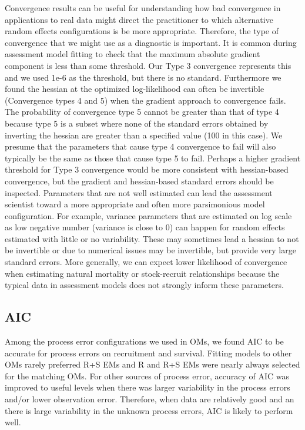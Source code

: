\documentclass[
  12pt,
]{article}
\begin{document}
Convergence results can be useful for understanding how bad convergence
in applications to real data might direct the practitioner to which
alternative random effects configurations is be more appropriate.
Therefore, the type of convergence that we might use as a diagnostic is
important. It is common during assessment model fitting to check that
the maximum absolute gradient component is less than some threshold. Our
Type 3 convergence represents this and we used 1e-6 as the threshold,
but there is no standard. Furthermore we found the hessian at the
optimized log-likelihood can often be invertible (Convergence types 4
and 5) when the gradient approach to convergence fails. The probability
of convergence type 5 cannot be greater than that of type 4 because type
5 is a subset where none of the standard errors obtained by inverting
the hessian are greater than a specified value (100 in this case). We
presume that the parameters that cause type 4 convergence to fail will
also typically be the same as those that cause type 5 to fail. Perhaps a
higher gradient threshold for Type 3 convergence would be more
consistent with hessian-based convergence, but the gradient and
hessian-based standard errors should be inspected. Parameters that are
not well estimated can lead the assessment scientist toward a more
appropriate and often more parsimonious model configuration. For
example, variance parameters that are estimated on log scale as low
negative number (variance is close to 0) can happen for random effects
estimated with little or no variability. These may sometimes lead a
hessian to not be invertible or due to numerical issues may be
invertible, but provide very large standard errors. More generally, we
can expect lower likelihood of convergence when estimating natural
mortality or stock-recruit relationships because the typical data in
assessment models does not strongly inform these parameters.

\hypertarget{aic}{%
\subsection*{AIC}\label{aic}}

Among the process error configurations we used in OMs, we found AIC to
be accurate for process errors on recruitment and survival. Fitting
models to other OMs rarely preferred R+S EMs and R and R+S EMs were
nearly always selected for the matching OMs. For other sources of
process error, accuracy of AIC was improved to useful levels when there
was larger variability in the process errors and/or lower observation
error. Therefore, when data are relatively good and an there is large
variability in the unknown process errors, AIC is likely to perform
well.
\end{document}
